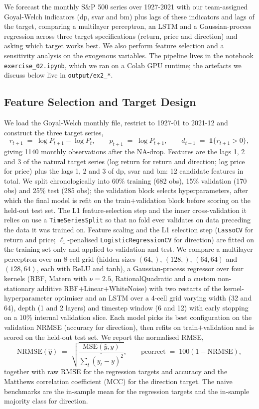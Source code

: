 \documentclass[12pt,a4paper]{article}
\newcommand{\probsub}[2]{\subsection{#2}}
\newcommand{\code}[1]{\texttt{#1}}
\begin{document}
We forecast the monthly S\&P 500 series over 1927-2021 with our team-assigned Goyal-Welch indicators (dp, svar and bm) plus lags of these indicators and lags of the target, comparing a multilayer perceptron, an LSTM and a Gaussian-process regression across three target specifications (return, price and direction) and asking which target works best. We also perform feature selection and a sensitivity analysis on the exogenous variables. The pipeline lives in the notebook \code{exercise\_02.ipynb}, which we ran on a Colab GPU runtime; the artefacts we discuss below live in \code{output/ex2\_*}.

\probsub{2a}{Feature Selection and Target Design}

We load the Goyal-Welch monthly file, restrict to 1927-01 to 2021-12 and construct the three target series,
\[
r_{t+1} \;=\; \log P_{t+1} - \log P_t,\qquad
p_{t+1} \;=\; \log P_{t+1},\qquad
d_{t+1} \;=\; \mathbf{1}\{r_{t+1} > 0\},
\]
giving 1140 monthly observations after the NA-drop. Features are the lags 1, 2 and 3 of the natural target series (log return for return and direction; log price for price) plus the lags 1, 2 and 3 of dp, svar and bm: 12 candidate features in total. We split chronologically into 60\% training (682 obs), 15\% validation (170 obs) and 25\% test (285 obs); the validation block selects hyperparameters, after which the final model is refit on the train$+$validation block before scoring on the held-out test set. The L1 feature-selection step and the inner cross-validation it relies on use a \code{TimeSeriesSplit} so that no fold ever validates on data preceding the data it was trained on. Feature scaling and the L1 selection step (\code{LassoCV} for return and price; $\ell_1$-penalised \code{LogisticRegressionCV} for direction) are fitted on the training set only and applied to validation and test. We compare a multilayer perceptron over an 8-cell grid (hidden sizes $(64,)$, $(128,)$, $(64,64)$ and $(128,64)$, each with ReLU and tanh), a Gaussian-process regressor over four kernels (RBF, Matern with $\nu=2.5$, RationalQuadratic and a custom non-stationary additive RBF$+$Linear$+$WhiteNoise) with two restarts of the kernel-hyperparameter optimiser and an LSTM over a 4-cell grid varying width (32 and 64), depth (1 and 2 layers) and timestep window (6 and 12) with early stopping on a 10\% internal validation slice. Each model picks its best configuration on the validation NRMSE (accuracy for direction), then refits on train$+$validation and is scored on the held-out test set. We report the normalised RMSE,
\[
\mathrm{NRMSE}(\hat y) \;=\; \sqrt{\dfrac{\mathrm{MSE}(\hat y, y)}{\overline{\sum_t (y_t - \bar y)^2}}},
\qquad \mathrm{pcorrect} \;=\; 100 (1 - \mathrm{NRMSE}),
\]
together with raw RMSE for the regression targets and accuracy and the Matthews correlation coefficient (MCC) for the direction target. The naive benchmarks are the in-sample mean for the regression targets and the in-sample majority class for direction.
\end{document}
